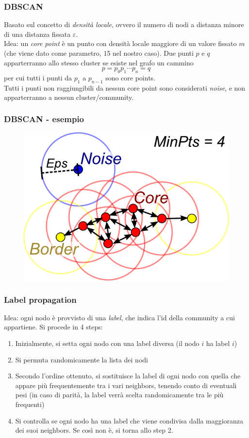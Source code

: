 \documentclass{beamer}
\begin{document}
\begin{frame}
\frametitle{DBSCAN}
Basato sul concetto di \textit{densit\`{a} locale}, ovvero il numero di nodi a distanza minore di una distanza fissata $\varepsilon$.\\
Idea: un \textit{core point} è un punto con densit\`{a} locale maggiore di un valore fissato $m$ (che viene dato come parametro, 15 nel nostro caso). Due punti $p$ e $q$ apparterranno allo stesso cluster se esiste nel grafo un cammino
$$
p = p_0 p_1\cdots p_n = q
$$
per cui tutti i punti da $p_1$ a $p_{n-1}$ sono core points.\\

Tutti i punti non raggiungibili da nessun core point sono considerati \textit{noise}, e non apparterranno a nessun cluster/community.
\end{frame}
\begin{frame}
\frametitle{DBSCAN - esempio}
  \begin{figure}[htbp]
\centering
\includegraphics[height=6.0 cm,width=10 cm]{DBSCAN.png}

\end{figure}

\end{frame}

\begin{frame}
\frametitle{Label propagation}
Idea: ogni nodo è provvisto di una \textit{label}, che indica l'id della community a cui appartiene. 
Si procede in 4 steps:
\begin{enumerate}
\item Inizialmente, si setta ogni nodo con una label diversa (il nodo $i$ ha label $i$)
\item Si permuta randomicamente la lista dei nodi
\item Secondo l'ordine ottenuto, si sostituisce la label di ogni nodo con quella che appare più frequentemente tra i vari neighbors, tenendo conto di eventuali pesi (in caso di parità, la label verrà scelta randomicamente tra le più frequenti)
\item Si controlla se ogni nodo ha una label che viene condivisa dalla maggioranza dei suoi neighbors. Se così non è, si torna allo step 2.
\end{enumerate}
\end{frame}
\end{document}
